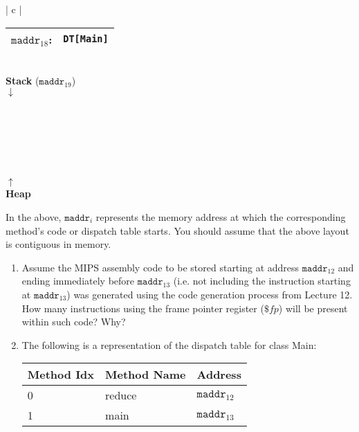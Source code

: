 \documentclass[11pt]{article}
\begin{document}
\begin{enumerate}
\begin{tabular}{ | c | }
\begin{tabular}{ | R{2cm} | L{9cm} |}
  $\mathtt{maddr}_{18}$: & \texttt{DT[Main]} \\
  \hline
  \end{tabular} \\
  \textbf{Stack} ($\mathtt{maddr}_{19}$) \\
  $\downarrow$ \\
  \\
  \\
  \\
  \hline
  \\
  \\
  \\
  $\uparrow$ \\
  \textbf{Heap} \\
  \hline
  \end{tabular}
  
  In the above, $\mathtt{maddr}_i$ represents the memory address at which the corresponding method's code or dispatch table starts. You should assume that the above layout is contiguous in memory.
  
  \begin{enumerate}
    \item Assume the MIPS assembly code to be stored starting at address $\mathtt{maddr}_{12}$ and ending immediately before $\mathtt{maddr}_{13}$ (i.e. not including the instruction starting at $\mathtt{maddr}_{13}$) was generated using the code generation process from Lecture 12. How many instructions using the frame pointer register ($\$fp$) will be present within such code? Why?
    \item  The following is a representation of the dispatch table for class Main: \\
    
    \begin{tabular}{ | l | l | l | }
    \hline
    Method Idx & Method Name & Address \\
    \hline
    0 & reduce & $\mathtt{maddr}_{12}$ \\
    \hline
    1 & main & $\mathtt{maddr}_{13}$ \\
    \hline
    \end{tabular} \\
    

\end{enumerate}
\end{enumerate}
\end{document}
